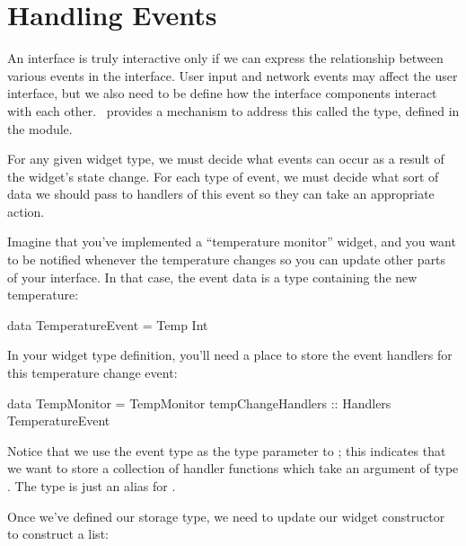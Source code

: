 \section{Handling Events}
\label{sec:event_handlers}

An interface is truly interactive only if we can express the
relationship between various events in the interface.  User input and
network events may affect the user interface, but we also need to be
define how the interface components interact with each other.
\vtyui\ provides a mechanism to address this called the 
type, defined in the  module.

For any given widget type, we must decide what events can occur as a
result of the widget's state change.  For each type of event, we must
decide what sort of data we should pass to handlers of this event so
they can take an appropriate action.

Imagine that you've implemented a ``temperature monitor'' widget, and
you want to be notified whenever the temperature changes so you can
update other parts of your interface.  In that case, the event data is
a type containing the new temperature:

\begin{haskellcode}
 data TemperatureEvent = Temp Int
\end{haskellcode}

In your widget type definition, you'll need a place to store the event
handlers for this temperature change event:

\begin{haskellcode}
 data TempMonitor =
   TempMonitor { tempChangeHandlers :: Handlers TemperatureEvent
               }
\end{haskellcode}

Notice that we use the event type as the type parameter to
; this indicates that we want to store a collection of
handler functions which take an argument of type
.  The  type is just an alias for
.

Once we've defined our storage type, we need to update our widget
constructor to construct a  list:


